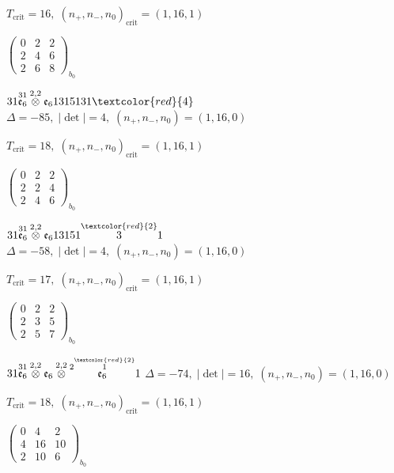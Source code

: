 \documentclass[10pt]{article}
\begin{document}
\hspace{1em}$T_{\text{crit}}=16,\; (n_+,n_-,n_0)_{\text{crit}}=(1,16,1)$

\hspace{2em}$\left(\begin{smallmatrix}0 & 2 & 2 \\ 2 & 4 & 6 \\ 2 & 6 & 8\end{smallmatrix}\right)_{\!b_0}$

$31\overset{31}{\mathfrak{e}_6}\overset{2,2}{\otimes}\mathfrak{e}_61315131\textcolor{red}{4}$ \quad $\Delta=-85,\; |\det|=4,\; (n_+,n_-,n_0)=(1,16,0)$

\hspace{1em}$T_{\text{crit}}=18,\; (n_+,n_-,n_0)_{\text{crit}}=(1,16,1)$

\hspace{2em}$\left(\begin{smallmatrix}0 & 2 & 2 \\ 2 & 2 & 4 \\ 2 & 4 & 6\end{smallmatrix}\right)_{\!b_0}$

$31\overset{31}{\mathfrak{e}_6}\overset{2,2}{\otimes}\mathfrak{e}_613151\overset{\textcolor{red}{2}}{3}1$ \quad $\Delta=-58,\; |\det|=4,\; (n_+,n_-,n_0)=(1,16,0)$

\hspace{1em}$T_{\text{crit}}=17,\; (n_+,n_-,n_0)_{\text{crit}}=(1,16,1)$

\hspace{2em}$\left(\begin{smallmatrix}0 & 2 & 2 \\ 2 & 3 & 5 \\ 2 & 5 & 7\end{smallmatrix}\right)_{\!b_0}$

\smallskip

$31\overset{31}{\mathfrak{e}_6}\overset{2,2}{\otimes}\mathfrak{e}_6\overset{2,2}{\otimes}\overset{2\overset{\textcolor{red}{2}}{1}}{\mathfrak{e}_6}1$ \quad $\Delta=-74,\; |\det|=16,\; (n_+,n_-,n_0)=(1,16,0)$

\hspace{1em}$T_{\text{crit}}=18,\; (n_+,n_-,n_0)_{\text{crit}}=(1,16,1)$

\hspace{2em}$\left(\begin{smallmatrix}0 & 4 & 2 \\ 4 & 16 & 10 \\ 2 & 10 & 6\end{smallmatrix}\right)_{\!b_0}$
\end{document}
